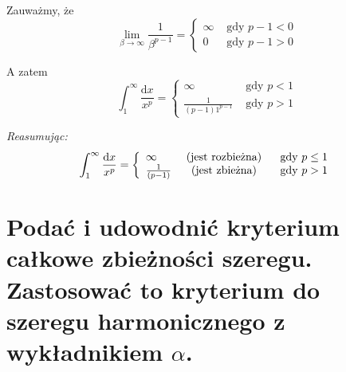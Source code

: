 \documentclass{article}
\theoremstyle{definition}
\theoremstyle{case}
\begin{document}
	Zauważmy, że
	\begin{equation*}
		\lim_{\beta \to \infty} \frac{1}{\beta^{p-1}}
		= \left\{
			\begin{array}{ll}
				\infty & \text{ gdy } p-1< 0
				\\ 0 & \text{ gdy } p-1> 0
			\end{array}
			\right.
		\end{equation*}

		A zatem
		\begin{equation*}
			\int_1^\infty \frac{\mathrm{d}x}{x^p}
			= \left\{
				\begin{array}{ll}
					\infty & \text{ gdy } p< 1
					\\ \frac{1}{(p-1)1^{p-1}} & \text{ gdy } p> 1
				\end{array}
				\right.
			\end{equation*}

			\textit{Reasumując:}
			\begin{equation*}
				\int_1^\infty \frac{\mathrm{d}x}{x^p}
				= \left\{
					\begin{array}{lcl}
						\infty & \textnormal{ (jest rozbieżna) } & \text{ gdy } p\leq1
						\\ \frac{1}{(p-1)} & \textnormal{ (jest zbieżna) } & \text{ gdy } p>1
					\end{array}
					\right.
				\end{equation*}

				\section{Podać i udowodnić kryterium całkowe zbieżności szeregu.
					Zastosować to kryterium do szeregu harmonicznego z wykładnikiem
					\texorpdfstring{$ \alpha $}{a}.}
\end{document}
